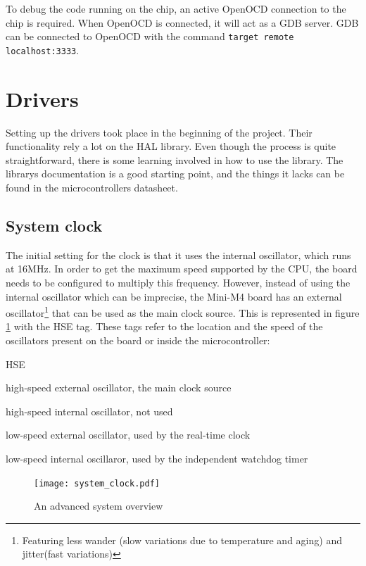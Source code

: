 To debug the code running on the chip, an active OpenOCD connection to the chip
is required. When OpenOCD is connected, it will act as a GDB server. GDB can
be connected to OpenOCD with the command \texttt{target remote localhost:3333}.

\section{Drivers}

Setting up the drivers took place in the beginning of the project. Their
functionality rely a lot on the HAL library. Even though the process is
quite straightforward, there is some learning involved in how to use the
library. The library\textquotesingle s documentation is a good starting
point, and the things it lacks can be found in the 
microcontroller\textquotesingle s datasheet.

\subsection{System clock}
The initial setting for the clock is that it uses the internal oscillator,
which runs at 16MHz. In order to get the maximum speed supported by the
CPU, the board needs to be configured to multiply this frequency.
However, instead of using the internal oscillator which can be imprecise, 
the Mini-M4 
board has an external oscillator\footnote{Featuring less wander (slow
 variations due to temperature and aging) and jitter(fast variations)} 
that can be used as the main clock 
source. This is represented in figure \ref{fig:system_clock} with the HSE
tag. These tags refer to the location and the speed of the oscillators
present on the board or inside the microcontroller:

\begin{labeling}{HSE}
	\item[\textbf{HSE}]
		high-speed external oscillator, the main clock source
	\item[\textbf{HSI}]
		high-speed internal oscillator, not used
	\item[\textbf{LSE}]
		low-speed external oscillator, used by the real-time clock
	\item[\textbf{LSI}]
		low-speed internal oscillaror, used by the independent watchdog
		timer
\end{labeling}

\begin{figure}[H]
\centering
\texttt{[image: system\_clock.pdf]}
\caption{An advanced system overview}
\label{fig:system_clock}
\end{figure}

